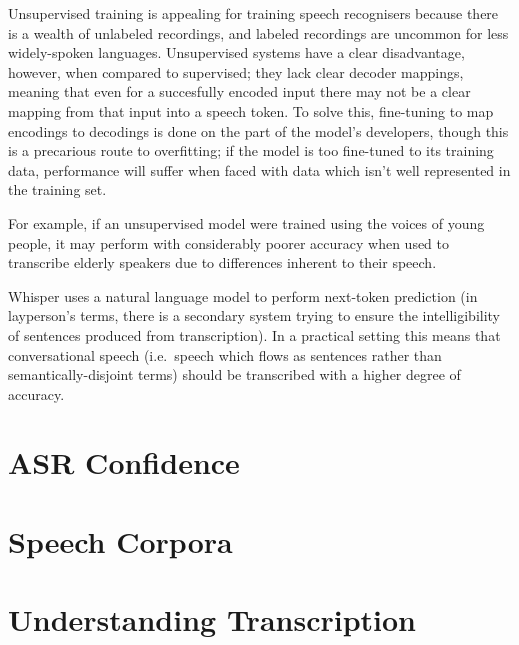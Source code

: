 Unsupervised training is appealing for training speech recognisers because there is a wealth of unlabeled recordings, and labeled recordings are uncommon for less widely-spoken languages\cite{baevski2021}.
Unsupervised systems have a clear disadvantage, however, when compared to supervised; they lack clear decoder mappings\cite{whisper}, meaning that even for a succesfully encoded input there may not be a clear mapping from that input into a speech token.
To solve this, fine-tuning to map encodings to decodings is done on the part of the model's developers, though this is a precarious route to overfitting;
if the model is too fine-tuned to its training data, performance will suffer when faced with data which isn't well represented in the training set.

For example, if an unsupervised model were trained using the voices of young people, it may perform with considerably poorer accuracy when used to transcribe elderly speakers due to differences inherent to their speech\cite{Horton2010}.

Whisper uses a natural language model to perform next-token prediction (in layperson's terms, there is a secondary system trying to ensure the intelligibility of sentences produced from transcription).
In a practical setting this means that conversational speech (i.e.\ speech which flows as sentences rather than semantically-disjoint terms) should be transcribed with a higher degree of accuracy.

\section{ASR Confidence}

\section{Speech Corpora}\label{sec:}

\section{Understanding Transcription}\label{sec:transcription}

